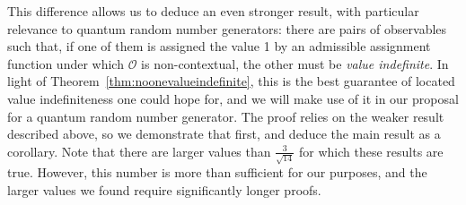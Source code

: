 \documentclass[%
 preprint,
 showpacs,
 showkeys,
 amsmath,
 amssymb,
 aps,
 pra,
 ]{revtex4-1}
\theoremstyle{definition}
\begin{document}
This difference allows us to deduce an even stronger result, with particular relevance to quantum random number generators: there are pairs of observables such that, if one of them is assigned the value 1 by an admissible assignment function under which $\mathcal{O}$ is non-contextual, the other must be {\em value indefinite}.
In light of Theorem~\ref{thm:noonevalueindefinite}, this is the best guarantee of located value indefiniteness one could hope for, and we will make use of it in our proposal for a quantum random number generator.
The proof relies on the weaker result described above, so we demonstrate that first, and deduce the main result as a corollary.
Note that there are larger values than $\frac{3}{\sqrt{14}}$ for which these results are true.
However, this number is more than sufficient for our purposes, and the larger values we found require significantly longer proofs.\\
\end{document}
